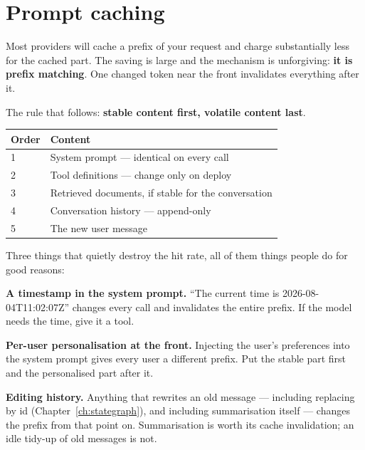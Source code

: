 \section{Prompt caching}
\label{sec:prompt-caching}

Most providers will cache a prefix of your request and charge substantially less
for the cached part. The saving is large and the mechanism is unforgiving:
\textbf{it is prefix matching}. One changed token near the front invalidates
everything after it.


The rule that follows: \textbf{stable content first, volatile content last}.

\begin{center}
\small
\begin{tabularx}{\linewidth}{@{}lX@{}}
\toprule
\textbf{Order} & \textbf{Content} \\
\midrule
1 & System prompt --- identical on every call \\
2 & Tool definitions --- change only on deploy \\
3 & Retrieved documents, if stable for the conversation \\
4 & Conversation history --- append-only \\
5 & The new user message \\
\bottomrule
\end{tabularx}
\end{center}

Three things that quietly destroy the hit rate, all of them things people do for
good reasons:

\textbf{A timestamp in the system prompt.} ``The current time is
2026-08-04T11:02:07Z'' changes every call and invalidates the entire prefix. If
the model needs the time, give it a tool.

\textbf{Per-user personalisation at the front.} Injecting the user's preferences
into the system prompt gives every user a different prefix. Put the stable part
first and the personalised part after it.

\textbf{Editing history.} Anything that rewrites an old message --- including
 replacing by id (Chapter~\ref{ch:stategraph}), and including
summarisation itself --- changes the prefix from that point on. Summarisation is
worth its cache invalidation; an idle tidy-up of old messages is not.

